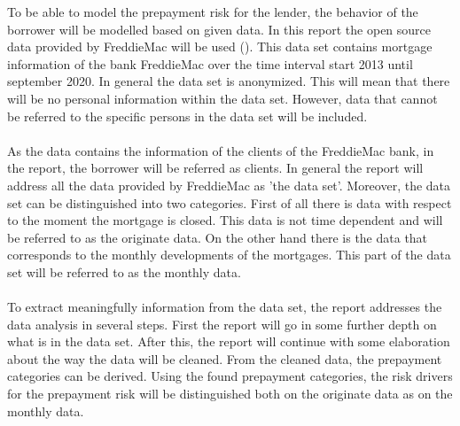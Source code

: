 To be able to model the prepayment risk for the lender, the behavior of 
the borrower will be modelled based on given data. In this report
the open source data provided by FreddieMac will be used (\cite{FredieMac}). This data set contains mortgage information of the bank FreddieMac over the time
interval start 2013 until september 2020. In general the data set is  anonymized.
This will mean that there will be no personal information within the data set.
However, data that cannot be referred to the specific persons in the data set
will be included.
\\\\
As the data contains the information of the clients of the FreddieMac bank, in 
the report, the borrower will be referred as clients. In general the report will 
address all the data provided by FreddieMac as 'the data set'. Moreover, the 
data set can be distinguished into two categories. First of all there is data 
with respect to the moment the mortgage is closed. This data is not time 
dependent and will be referred to as the originate data. On the other hand 
there is the data that corresponds to the monthly developments of the 
mortgages. This part of the data set will be referred to as the monthly 
data.
\\\\
To extract meaningfully information from the data set, the report addresses 
the data analysis in several steps. First the report will go in some 
further depth on what is in the data set. After this, the report will 
continue with some elaboration about the way the data will be cleaned. 
From the cleaned data, the prepayment categories can be derived. Using the 
found prepayment categories, the risk drivers for the prepayment risk 
will be distinguished both on the originate data as on the monthly data.  

